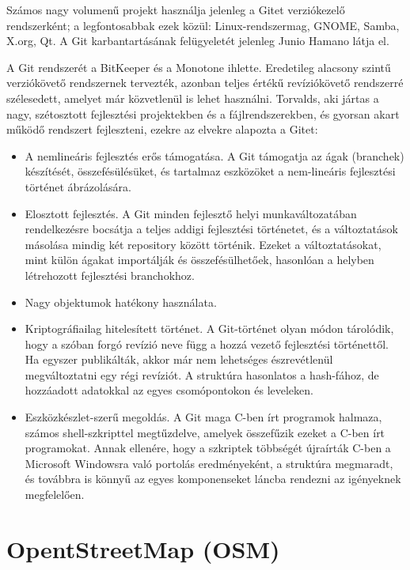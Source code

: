 \documentclass[a4paper,12pt]{report}
\begin{document}
\vspace{2mm}
Számos nagy volumenű projekt használja jelenleg a Gitet verziókezelő rendszerként; a legfontosabbak ezek közül: Linux-rendszermag, GNOME, Samba, X.org, Qt. A Git karbantartásának felügyeletét jelenleg Junio Hamano látja el.

\vspace{2mm}
A Git rendszerét a BitKeeper és a Monotone ihlette. Eredetileg alacsony szintű verziókövető rendszernek tervezték, azonban teljes értékű revíziókövető rendszerré szélesedett, amelyet már közvetlenül is lehet használni. Torvalds, aki jártas a nagy, szétosztott fejlesztési projektekben és a fájlrendszerekben, és gyorsan akart működő rendszert fejleszteni, ezekre az elvekre alapozta a Gitet:

\begin{itemize}
\item A nemlineáris fejlesztés erős támogatása. A Git támogatja az ágak (branchek) készítését, összefésülésüket, és tartalmaz eszközöket a nem-lineáris fejlesztési történet ábrázolására.
\item Elosztott fejlesztés. A Git minden fejlesztő helyi munkaváltozatában rendelkezésre bocsátja a teljes addigi fejlesztési történetet, és a változtatások másolása mindig két repository között történik. Ezeket a változtatásokat, mint külön ágakat importálják és összefésülhetőek, hasonlóan a helyben létrehozott fejlesztési branchokhoz.
\item Nagy objektumok hatékony használata.
\item Kriptográfiailag hitelesített történet. A Git-történet olyan módon tárolódik, hogy a szóban forgó revízió neve függ a hozzá vezető fejlesztési történettől. Ha egyszer publikálták, akkor már nem lehetséges észrevétlenül megváltoztatni egy régi revíziót. A struktúra hasonlatos a hash-fához, de hozzáadott adatokkal az egyes csomópontokon és leveleken.
\item Eszközkészlet-szerű megoldás. A Git maga C-ben írt programok halmaza, számos shell-szkripttel megtűzdelve, amelyek összefűzik ezeket a C-ben írt programokat. Annak ellenére, hogy a szkriptek többségét újraírták C-ben a Microsoft Windowsra való portolás eredményeként, a struktúra megmaradt, és továbbra is könnyű az egyes komponenseket láncba rendezni az igényeknek megfelelően.
\end{itemize}



\section{OpentStreetMap (OSM)}
\label{osm}
\end{document}

